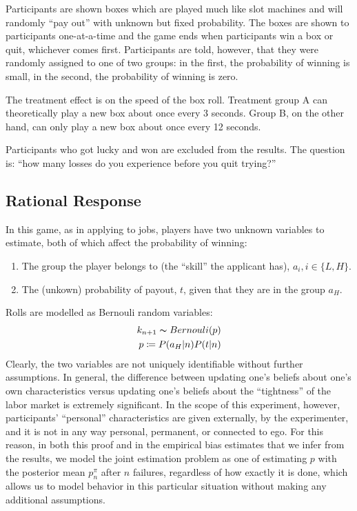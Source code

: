 \documentclass[a4paper,12pt]{article}
\begin{document}
Participants are shown boxes which are played much like slot machines and will randomly ``pay out'' with unknown but fixed probability. The boxes are shown to participants one-at-a-time and the game ends when participants win a box or quit, whichever comes first. Participants are told, however, that they were randomly assigned to one of two groups: in the first, the probability of winning is small, in the second, the probability of winning is zero.

The treatment effect is on the speed of the box roll. Treatment group A can theoretically play a new box about once every 3 seconds. Group B, on the other hand, can only play a new box about once every 12 seconds.

Participants who got lucky and won are excluded from the results. The question is: ``how many losses do you experience before you quit trying?''

\subsection{ Rational Response }

In this game, as in applying to jobs, players have two unknown variables to estimate, both of which affect the probability of winning:

\begin{enumerate}
\item The group the player belongs to (the ``skill'' the applicant has), $a_i, i \in \{L,H\}$.
\item The (unkown) probability of payout, $t$, given that they are in the group $a_H$.
\end{enumerate}
%
Rolls are modelled as Bernouli random variables:
\begin{align*}
k_{n+1} \thicksim Bernouli( p ) \\
p \coloneqq P(a_H | n)P(t | n)
\end{align*}
Clearly, the two variables are not uniquely identifiable without further assumptions. In general, the difference between updating one's beliefs about one's own characteristics versus updating one's beliefs about the ``tightness'' of the labor market is extremely significant. In the scope of this experiment, however, participants' ``personal'' characteristics are given externally, by the experimenter, and it is not in any way personal, permanent, or connected to ego. For this reason, in both this proof and in the empirical bias estimates that we infer from the results, we model the joint estimation problem as one of estimating $p$ with the posterior mean $p^{\pi}_n$ after $n$ failures, regardless of how exactly it is done, which allows us to model behavior in this particular situation without making any additional assumptions.
\end{document}
